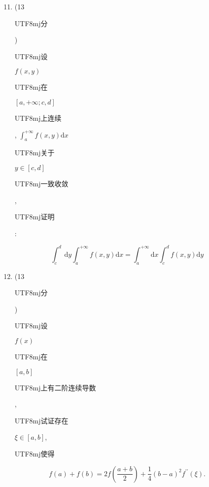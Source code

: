 \documentclass[10pt]{article}
\begin{document}
\begin{enumerate}
  \setcounter{enumi}{10}
  \item (13 \begin{CJK}{UTF8}{mj}分\end{CJK}) \begin{CJK}{UTF8}{mj}设\end{CJK} $f(x, y)$ \begin{CJK}{UTF8}{mj}在\end{CJK} $[a,+\infty ; c, d]$ \begin{CJK}{UTF8}{mj}上连续\end{CJK}, $\int_{a}^{+\infty} f(x, y) \mathrm{d} x$ \begin{CJK}{UTF8}{mj}关于\end{CJK} $y \in[c, d]$ \begin{CJK}{UTF8}{mj}一致收敛\end{CJK}, \begin{CJK}{UTF8}{mj}证明\end{CJK}:
\end{enumerate}
$$
\int_{c}^{d} \mathrm{~d} y \int_{a}^{+\infty} f(x, y) \mathrm{d} x=\int_{a}^{+\infty} \mathrm{d} x \int_{c}^{d} f(x, y) \mathrm{d} y
$$

\begin{enumerate}
  \setcounter{enumi}{11}
  \item (13 \begin{CJK}{UTF8}{mj}分\end{CJK}) \begin{CJK}{UTF8}{mj}设\end{CJK} $f(x)$ \begin{CJK}{UTF8}{mj}在\end{CJK} $[a, b]$ \begin{CJK}{UTF8}{mj}上有二阶连续导数\end{CJK}, \begin{CJK}{UTF8}{mj}试证存在\end{CJK} $\xi \in[a, b]$, \begin{CJK}{UTF8}{mj}使得\end{CJK}
\end{enumerate}
$$
f(a)+f(b)=2 f\left(\frac{a+b}{2}\right)+\frac{1}{4}(b-a)^{2} f^{\prime \prime}(\xi) .
$$
\end{document}
